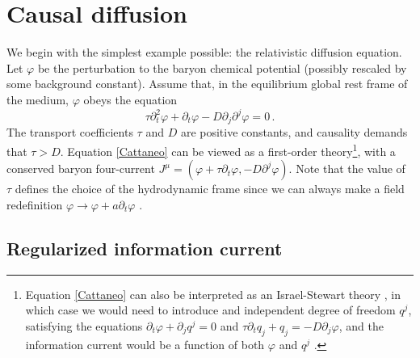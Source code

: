 \documentclass[a4paper, amsfonts, amssymb, amsmath, reprint, showkeys, nofootinbib, twoside,notitlepage,onecolumn,preprintnumbers]{revtex4-2}
\theoremstyle{definition}
\theoremstyle{theorem}
\theoremstyle{corollary}
\begin{document}
\section{Causal diffusion}\label{bazinga!}

We begin with the simplest example possible: the relativistic diffusion equation. Let $\varphi$ be the perturbation to the baryon chemical potential (possibly rescaled by some background constant). Assume that, in the equilibrium global rest frame of the medium, $\varphi$ obeys the equation
\begin{equation}\label{Cattaneo}
\tau \partial^2_t \varphi +\partial_t \varphi -D \partial_j \partial^j \varphi=0 \, .
\end{equation}
The transport coefficients $\tau$ and $D$ are positive constants, and causality demands that $\tau>D$. Equation \eqref{Cattaneo} can be viewed as a first-order theory\footnote{Equation \eqref{Cattaneo} can also be interpreted as an Israel-Stewart theory \cite{Israel_Stewart_1979,cattaneo1958}, in which case we would need to introduce and independent degree of freedom $q^j$, satisfying the equations $\partial_t \varphi +\partial_j q^j=0$ and $\tau \partial_t q_j +q_j =-D\partial_j \varphi$, and the information current would be a function of both $\varphi$ and $q^j$ \cite{GavassinoNonHydro2022,GavassinoUniversality2023}.}, with a conserved baryon four-current $J^\mu =(\varphi+\tau \partial_t \varphi, -D \partial^j \varphi)$. Note that the value of $\tau$ defines the choice of the hydrodynamic frame since we can always make a field redefinition $\varphi \rightarrow \varphi + a \partial_t \varphi$ \cite{Kovtun2019}.

\subsection{Regularized information current}
\end{document}
